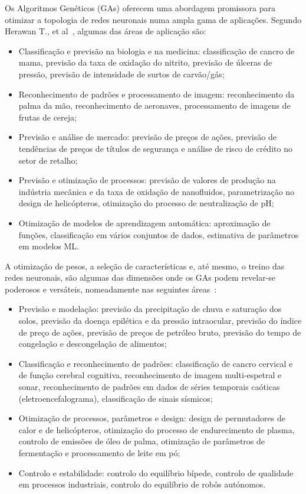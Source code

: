 \documentclass[conference]{IEEEtran}
\begin{document}
Os Algoritmos Genéticos (GAs) oferecem uma abordagem promissora para otimizar a topologia de redes neuronais numa ampla gama de aplicações. Segundo Herawan T., et al~\cite{Chiroma2017NeuralReview}, algumas das áreas de aplicação são:
\begin{itemize}
    \item Classificação e previsão na biologia e na medicina: classificação de cancro de mama, previsão da taxa de oxidação do nitrito, previsão de úlceras de pressão, previsão de intensidade de surtos de carvão/gás;
    \item Reconhecimento de padrões e processamento de imagem: reconhecimento da palma da mão, reconhecimento de aeronaves, processamento de imagens de frutas de cereja;
    \item Previsão e análise de mercado: previsão de preços de ações, previsão de tendências de preços de títulos de segurança e análise de risco de crédito no setor de retalho;
    \item Previsão e otimização de processos: previsão de valores de produção na indústria mecânica e da taxa de oxidação de nanofluidos, parametrização no design de helicópteros, otimização do processo de neutralização de pH;
    \item Otimização de modelos de aprendizagem automática: aproximação de funções, classificação em vários conjuntos de dados, estimativa de parâmetros em modelos ML.
\end{itemize}

A otimização de pesos, a seleção de características e, até mesmo, o treino das redes neuronais, são algumas das dimensões onde os GAs podem revelar-se poderosos e versáteis, nomeadamente nas seguintes áreas~\cite{Chiroma2017NeuralReview}:
\begin{itemize}
    \item Previsão e modelação: previsão da precipitação de chuva e saturação dos solos, previsão da doença epilética e da pressão intraocular, previsão do índice de preço de ações, previsão de preços de petróleo bruto, previsão do tempo de congelação e descongelação de alimentos;
    \item Classificação e reconhecimento de padrões: classificação de cancro cervical e de função cerebral cognitiva, reconhecimento de imagem multi-espetral e sonar, reconhecimento de padrões em dados de séries temporais caóticas (eletroencefalograma), classificação de sinais sísmicos;
    \item Otimização de processos, parâmetros e design: design de permutadores de calor e de helicópteros, otimização do processo de endurecimento de plasma, controlo de emissões de óleo de palma, otimização de parâmetros de fermentação e  processamento de leite em pó;
    \item Controlo e estabilidade: controlo do equilíbrio bípede, controlo de qualidade em processos industriais, controlo do equilíbrio de robôs autónomos.
\end{itemize}
\end{document}
